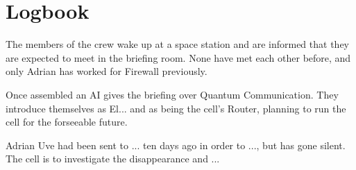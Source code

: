 
\chapter{Logbook}


The members of the crew wake up at a space station and are informed that they are expected to meet in the briefing room. None have met each other before, and only Adrian has worked for Firewall previously.

Once assembled an AI gives the briefing over Quantum Communication. They introduce themselves as El... and as being the cell's Router, planning to run the cell for the forseeable future.

Adrian Uve had been sent to ... ten days ago in order to ..., but has gone silent. The cell is to investigate the disappearance and ...

